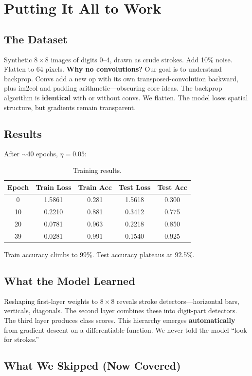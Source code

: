 \documentclass[11pt,a4paper]{book}
\begin{document}
\chapter{Putting It All to Work}\label{ch:application}

\section{The Dataset}
Synthetic $8 \times 8$ images of digits 0--4, drawn as crude strokes. Add 10\% noise. Flatten to 64 pixels.
\textbf{Why no convolutions?} Our goal is to understand backprop. Convs add a new op with its own transposed-convolution backward, plus im2col and padding arithmetic---obscuring core ideas. The backprop algorithm is \textbf{identical} with or without convs. We flatten. The model loses spatial structure, but gradients remain transparent.

\section{Results}
After $\sim$40 epochs, $\eta = 0.05$:
\begin{table}[H]
\centering
\caption{Training results.}
\begin{tabular}{@{}ccccc@{}}
\toprule
Epoch & Train Loss & Train Acc & Test Loss & Test Acc \\
\midrule
0  & 1.5861 & 0.281 & 1.5618 & 0.300 \\
10 & 0.2210 & 0.881 & 0.3412 & 0.775 \\
20 & 0.0781 & 0.963 & 0.2218 & 0.850 \\
39 & 0.0281 & 0.991 & 0.1540 & 0.925 \\
\bottomrule
\end{tabular}
\end{table}
Train accuracy climbs to 99\%. Test accuracy plateaus at 92.5\%.

\section{What the Model Learned}
Reshaping first-layer weights to $8 \times 8$ reveals stroke detectors---horizontal bars, verticals, diagonals. The second layer combines these into digit-part detectors. The third layer produces class scores. This hierarchy emerges \textbf{automatically} from gradient descent on a differentiable function. We never told the model ``look for strokes.''

\section{What We Skipped (Now Covered)}
\end{document}
